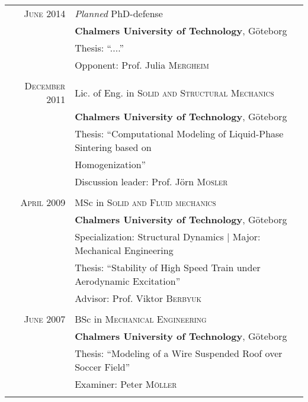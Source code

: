 \documentclass[a4paper,10pt]{article} %
\begin{document}
\begin{tabular}{rl}


\textsc{June} 2014 & \textit{Planned} PhD-defense \\
& \textbf{Chalmers University of Technology}, Göteborg\\
& Thesis: ``....''\\
& \small Opponent: Prof. Julia \textsc{Mergheim}\\
&\\


\textsc{December} 2011 & Lic. of Eng. in \textsc{Solid and Structural Mechanics} \\
& \textbf{Chalmers University of Technology}, Göteborg\\
& Thesis: ``Computational Modeling of Liquid-Phase Sintering based on \\
& Homogenization''\\
& \small Discussion leader: Prof. Jörn \textsc{Mosler}\\
&\\


\textsc{April} 2009 & MSc in \textsc{Solid and Fluid mechanics}\\
& \textbf{Chalmers University of Technology}, Göteborg\\
& Specialization: Structural Dynamics | Major: Mechanical Engineering\\
& Thesis: ``Stability of High Speed Train under Aerodynamic Excitation''\\
& \small Advisor: Prof. Viktor \textsc{Berbyuk}\\
&\\


\textsc{June} 2007 & BSc in \textsc{Mechanical Engineering}\\
& \textbf{Chalmers University of Technology}, Göteborg\\
& Thesis: ``Modeling of a Wire Suspended Roof over Soccer Field''\\
& \small Examiner: Peter \textsc{Möller}\\
&\\


\end{tabular}
\end{document}
